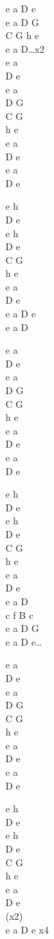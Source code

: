 \begin{chord}
    \begin{tinyTwelve}
    e a D e\\
    e a D G\\
    C G h e\\
    e a D…x2\\
    e a\\
    D e\\
    e a\\
    D G\\
    C G\\
    h e\\
    e a\\
    D e\\
    e a\\
    D e

    e h\\
    D e\\
    e h\\
    D e\\
    C G\\
    h e\\
    e a\\
    D e\\
    e a D e\\
    e a D

    e a\\
    D e\\
    e a\\
    D G\\
    C G\\
    h e\\
    e a\\
    D e\\
    e a\\
    D e

    e h\\
    D e\\
    e h\\
    D e\\
    C G\\
    h e\\
    e a\\
    D e\\
    e a D\\
    c f B c\\
    e a D G \\
    e a D e…

e a\\
D e\\
e a\\
D G\\
C G\\
h e\\
e a\\
D e\\
e a\\
D e

e h\\
D e\\
e h\\
D e\\
C G\\
h e\\
e a\\
D e\\
(x2)\\
e a D e x4
\end{tinyTwelve}
\end{chord}
